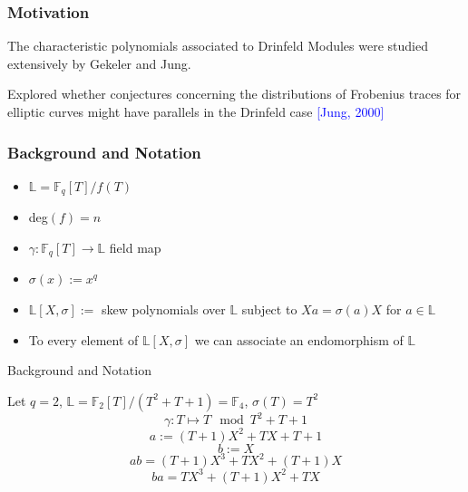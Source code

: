 \documentclass{beamer}
\newcommand{\f}{\mathbb{F}}
\newcommand{\blue}{\textcolor{blue}}
\begin{document}

\begin{frame}

\frametitle{Motivation}

\item The characteristic polynomials associated to Drinfeld Modules were studied extensively by Gekeler and Jung. 

\item Explored whether conjectures concerning the distributions of Frobenius traces for elliptic curves might have parallels in the Drinfeld case \blue{[Jung, 2000]}



    
\end{frame}




\begin{frame}
\frametitle{Background and Notation}

\begin{itemize}

\item $\mathbb{L} = \mathbb{F}_q[T]/f(T)$
\item deg$(f) = n$
\item $\gamma: \mathbb{F}_q[T] \to \mathbb{L}$ field map
\item $\sigma(x) := x^q$
\item $\mathbb{L}[X,\sigma] := $ skew polynomials over $\mathbb{L}$ subject to $Xa = \sigma(a)X$ for $a \in \mathbb{L}$ 
\item To every element of $\mathbb{L}[X,\sigma]$ we can associate an endomorphism of $\mathbb{L}$

\end{itemize}
\end{frame}
\begin{frame}{Background and Notation}


\begin{example}
Let $q = 2$, $\mathbb{L} = \mathbb{F}_2[T]/(T^2 + T + 1) = \mathbb{F}_4$, $\sigma(T) = T^2$
\[ \gamma : T \mapsto T \mod T^2 + T + 1\]
\[ a:= (T + 1)X^2 + TX + T + 1 \]
\[b := X\]
\[ab = (T + 1)X^3 + TX^2 + (T + 1)X\]
\[ba = TX^3 + (T+1)X^2 + TX \]
\end{example}



\end{frame}
\end{document}
